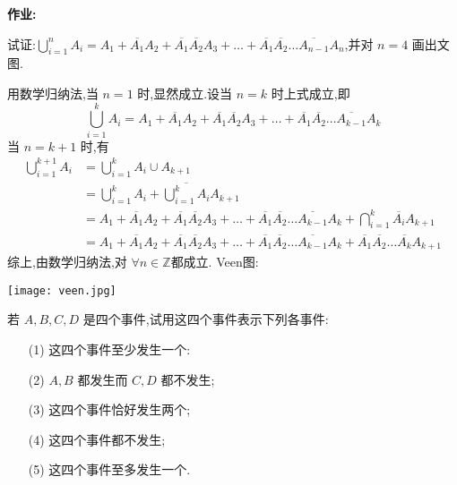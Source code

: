 \documentclass[12pt,letterpaper,boxed]{hmcpset}
\begin{document}
\begin{CJK}{UTF8}{}

\headerblock

\setlength{\parindent}{0pt} 
\Large \textbf{作业:}
\large

  \begin{problem}[Ex4:]
    试证:$\bigcup_{i=1}^n A_i = A_1 + \overline{A_1}A_2 + \overline{A_1}\overline{A_2}A_3 + \ldots + \overline{A_1}\overline{A_2}\ldots\overline{A_{n-1}}A_n $,并对 $n=4$ 画出文图.
  \end{problem}
  \begin{solution}
    用数学归纳法,当 $n=1$ 时,显然成立.设当 $n = k $ 时上式成立,即
    \[ \bigcup_{i=1}^k A_i = A_1 + \overline{A_1}A_2 + \overline{A_1}\overline{A_2}A_3 + \ldots + \overline{A_1}\overline{A_2}\ldots\overline{A_{k-1}}A_k  \]
    当 $ n = k + 1 $ 时,有
    \begin{align*}
    \bigcup_{i=1}^{k+1} A_i & =\bigcup_{i=1}^{k} A_i \cup A_{k+1} \\
        & = \bigcup_{i=1}^{k} A_i + \overline{\bigcup_{i=1}^{k} A_i} A_{k+1} \\
        & = A_1 + \overline{A_1}A_2 + \overline{A_1}\overline{A_2}A_3 + \ldots + \overline{A_1}\overline{A_2}\ldots\overline{A_{k-1}} A_k + \bigcap_{i=1}^{k} \overline{A_i} A_{k+1}\\
        & = A_1 + \overline{A_1}A_2 + \overline{A_1}\overline{A_2}A_3 + \ldots + \overline{A_1}\overline{A_2}\ldots\overline{A_{k-1}} A_k + \overline{A_1}\overline{A_2}\ldots\overline{A_{k}} A_{k+1}
    \end{align*}
        综上,由数学归纳法,对 $ \forall n \in \mathbb{Z} $都成立.
        \newpage
        Veen图:
        \begin{center}
          \texttt{[image: veen.jpg]}
        \end{center}
  \end{solution}

  \begin{problem}[Ex6:]
    若 $A,B,C,D$ 是四个事件,试用这四个事件表示下列各事件:
      \begin{itemize}
        \item[(1)] 这四个事件至少发生一个:
        \item[(2)] $A,B$ 都发生而 $C,D$ 都不发生;
        \item[(3)] 这四个事件恰好发生两个;
        \item[(4)] 这四个事件都不发生;
        \item[(5)] 这四个事件至多发生一个.
      \end{itemize}
  \end{problem}
  

\end{CJK}
\end{document}
